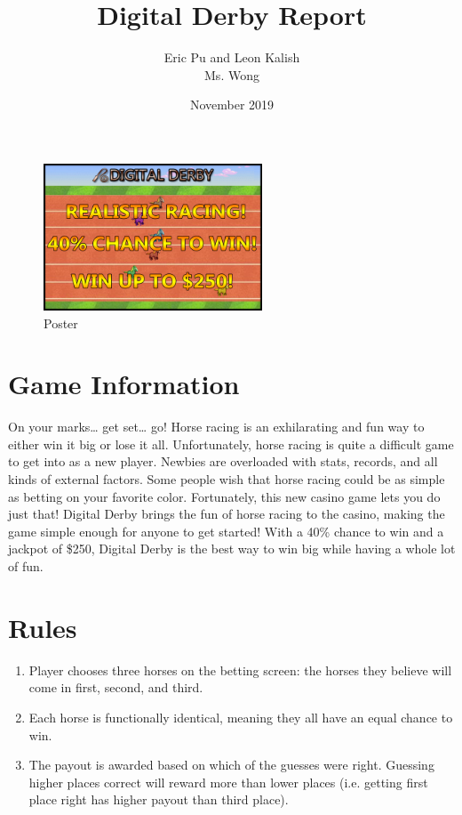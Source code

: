 \documentclass{article}
\title{Digital Derby Report}
\author{Eric Pu and Leon Kalish \\ Ms. Wong}
\date{November 2019}
\begin{document}
\maketitle

\graphicspath{ {./images/} }

\newpage
\tableofcontents
\newpage

\begin{figure}[h]
\centering
\includegraphics[width=6.5cm]{images/poster.png}
\caption{Poster}
\end{figure}

\section{Game Information}
{
On your marks… get set… go! Horse racing is an exhilarating and fun way to either win it big or lose it all. Unfortunately, horse racing is quite a difficult game to get into as a new player. Newbies are overloaded with stats, records, and all kinds of external factors. Some people wish that horse racing could be as simple as betting on your favorite color. Fortunately, this new casino game lets you do just that! Digital Derby brings the fun of horse racing to the casino, making the game simple enough for anyone to get started! With a 40\% chance to win and a jackpot of \$250, Digital Derby is the best way to win big while having a whole lot of fun.
\vspace{5mm}

\section{Rules}
{
\begin{enumerate}
    \item Player chooses three horses on the betting screen: the horses they believe will come in first, second, and third.
    \item Each horse is functionally identical, meaning they all have an equal chance to win.
    \item The payout is awarded based on which of the guesses were right. Guessing higher places correct will reward more than lower places (i.e. getting first place right has higher payout than third place). 
\end{enumerate}

}



}
\end{document}
